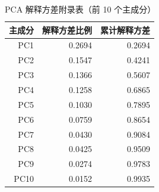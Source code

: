 \begin{table}[H]
\centering
\caption{PCA 解释方差附录表（前 10 个主成分）}
\label{tab:pca-explained-variance}
\begin{tabular}{rrr}
\toprule
主成分 & 解释方差比例 & 累计解释方差 \\
\midrule
PC1 & 0.2694 & 0.2694 \\
PC2 & 0.1547 & 0.4241 \\
PC3 & 0.1366 & 0.5607 \\
PC4 & 0.1258 & 0.6865 \\
PC5 & 0.1030 & 0.7895 \\
PC6 & 0.0759 & 0.8654 \\
PC7 & 0.0430 & 0.9084 \\
PC8 & 0.0425 & 0.9509 \\
PC9 & 0.0274 & 0.9783 \\
PC10 & 0.0152 & 0.9935 \\
\bottomrule
\end{tabular}
\end{table}
